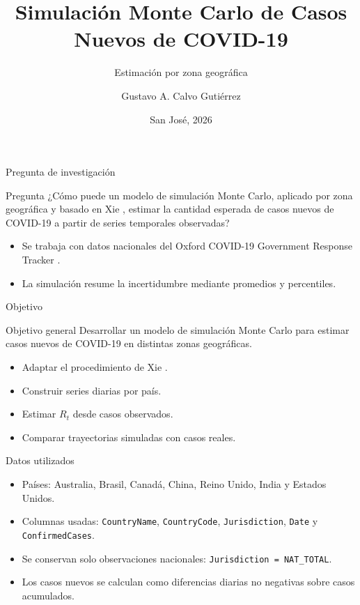 \documentclass[aspectratio=169]{beamer}
\title{Simulación Monte Carlo de Casos Nuevos de COVID-19}
\subtitle{Estimación por zona geográfica}
\author{Gustavo A. Calvo Gutiérrez}
\institute{Universidad de Costa Rica}
\date{San José, 2026}
\begin{document}
\begin{frame}
  \titlepage
\end{frame}

\begin{frame}{Pregunta de investigación}
  \begin{block}{Pregunta}
    ¿Cómo puede un modelo de simulación Monte Carlo, aplicado por zona
    geográfica y basado en Xie \cite{Xie2020}, estimar la cantidad esperada de
    casos nuevos de COVID-19 a partir de series temporales observadas?
  \end{block}

  \begin{itemize}
    \item Se trabaja con datos nacionales del Oxford COVID-19 Government
          Response Tracker \cite{Hale2021}.
    \item La simulación resume la incertidumbre mediante promedios y
          percentiles.
  \end{itemize}
\end{frame}

\begin{frame}{Objetivo}
  \begin{block}{Objetivo general}
    Desarrollar un modelo de simulación Monte Carlo para estimar casos nuevos
    de COVID-19 en distintas zonas geográficas.
  \end{block}

  \begin{itemize}
    \item Adaptar el procedimiento de Xie \cite{Xie2020}.
    \item Construir series diarias por país.
    \item Estimar \(R_t\) desde casos observados.
    \item Comparar trayectorias simuladas con casos reales.
  \end{itemize}
\end{frame}

\begin{frame}{Datos utilizados}
  \begin{itemize}
    \item Países: Australia, Brasil, Canadá, China, Reino Unido, India y
          Estados Unidos.
    \item Columnas usadas: \texttt{CountryName}, \texttt{CountryCode},
          \texttt{Jurisdiction}, \texttt{Date} y \texttt{ConfirmedCases}.
    \item Se conservan solo observaciones nacionales:
          \texttt{Jurisdiction = NAT\_TOTAL}.
    \item Los casos nuevos se calculan como diferencias diarias no negativas
          sobre casos acumulados.
  \end{itemize}
\end{frame}
\end{document}
